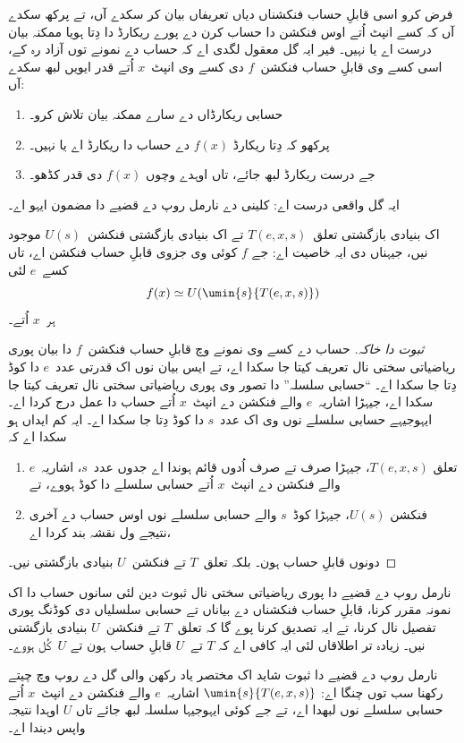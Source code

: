 \documentclass[../../../include/open-logic-section]{subfiles}
\begin{document}

فرض کرو اسی قابلِ حساب فنکشناں دیاں تعریفاں بیان کر سکدے
آں، تے پرکھ سکدے آں کہ کسے انپٹ اُتے اوس فنکشن دا حساب کرن دے
پورے ریکارڈ دا دِتا ہویا ممکنہ بیان درست اے یا نہیں۔ فیر
ایہ گل معقول لگدی اے کہ حساب دے نمونے توں آزاد رہ کے، اسی
کسے وی قابلِ حساب فنکشن~$f$ دی کسے وی انپٹ~$x$ اُتے قدر
ایویں لبھ سکدے آں:
\begin{enumerate}
  \item حسابی ریکارڈاں دے سارے ممکنہ بیان تلاش کرو۔
  \item پرکھو کہ دِتا ریکارڈ $f(x)$ دے حساب دا ریکارڈ اے یا نہیں۔
  \item جے درست ریکارڈ لبھ جائے، تاں اوہدے وچوں $f(x)$ دی قدر کڈھو۔
\end{enumerate}
ایہ گل واقعی درست اے: کلینی دے نارمل روپ دے قضیے دا مضمون
ایہو اے۔

\begin{thm}
اک بنیادی بازگشتی تعلق~$T(e, x, s)$ تے اک بنیادی بازگشتی
فنکشن~$U(s)$ موجود نیں، جیہناں دی ایہ خاصیت اے: جے $f$
کوئی وی جزوی قابلِ حساب فنکشن اے، تاں کسے~$e$ لئی
\[
f(x) \simeq U(\umin{s}{T(e, x, s)})
\]
ہر~$x$ اُتے۔
\end{thm}

\begin{proof}[ثبوت دا خاکہ]
حساب دے کسے وی نمونے وچ قابلِ حساب فنکشن~$f$ دا بیان پوری
ریاضیاتی سختی نال تعریف کیتا جا سکدا اے، تے ایس بیان نوں
اک قدرتی عدد~$e$ دا کوڈ دِتا جا سکدا اے۔ ``حسابی سلسلہ''
دا تصور وی پوری ریاضیاتی سختی نال تعریف کیتا جا سکدا اے،
جیہڑا اشاریہ~$e$ والے فنکشن دے انپٹ~$x$ اُتے حساب دا
عمل درج کردا اے۔ ایہوجیہے حسابی سلسلے نوں وی اک عدد~$s$
دا کوڈ دِتا جا سکدا اے۔ ایہ کم ایداں ہو سکدا اے کہ
\begin{enumerate}
  \item تعلق $T(e, x, s)$، جیہڑا صرف تے صرف اُدوں قائم ہوندا اے جدوں
  عدد~$s$، اشاریہ~$e$ والے فنکشن دے انپٹ~$x$ اُتے حسابی
  سلسلے دا کوڈ ہووے، تے
  \item فنکشن $U(s)$، جیہڑا کوڈ~$s$ والے حسابی سلسلے نوں
  اوس حساب دے آخری نتیجے ول نقشہ بند کردا اے،
\end{enumerate}
دونوں قابلِ حساب ہون۔ بلکہ تعلق~$T$ تے فنکشن~$U$ بنیادی
بازگشتی نیں۔
\end{proof}

\begin{explain}
نارمل روپ دے قضیے دا پوری ریاضیاتی سختی نال ثبوت دین لئی
سانوں حساب دا اک نمونہ مقرر کرنا، قابلِ حساب فنکشناں دے
بیاناں تے حسابی سلسلیاں دی کوڈنگ پوری تفصیل نال کرنا، تے
ایہ تصدیق کرنا پوے گا کہ تعلق~$T$ تے فنکشن~$U$ بنیادی
بازگشتی نیں۔ زیادہ تر اطلاقاں لئی ایہ کافی اے کہ $T$
تے~$U$ قابلِ حساب ہون تے $U$~کُل ہووے۔

نارمل روپ دے قضیے دا ثبوت شاید اک مختصر یاد رکھن والی گل
دے روپ وچ چیتے رکھنا سب توں چنگا اے: $\umin{s}{T(e, x, s)}$
اشاریہ~$e$ والے فنکشن دے انپٹ~$x$ اُتے حسابی سلسلے نوں
لبھدا اے، تے جے کوئی ایہوجیہا سلسلہ لبھ جائے تاں $U$
اوہدا نتیجہ واپس دیندا اے۔
\end{explain}
\end{document}
